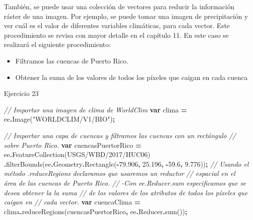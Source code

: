 \documentclass[
  12pt,
  letterpaper,
  twoside]{book}
\newenvironment{Shaded}{\begin{snugshade}}{\end{snugshade}}
\newcommand{\AttributeTok}[1]{\textcolor[rgb]{0.77,0.63,0.00}{#1}}
\newcommand{\CommentTok}[1]{\textcolor[rgb]{0.56,0.35,0.01}{\textit{#1}}}
\newcommand{\FloatTok}[1]{\textcolor[rgb]{0.00,0.00,0.81}{#1}}
\newcommand{\FunctionTok}[1]{\textcolor[rgb]{0.00,0.00,0.00}{#1}}
\newcommand{\KeywordTok}[1]{\textcolor[rgb]{0.13,0.29,0.53}{\textbf{#1}}}
\newcommand{\NormalTok}[1]{#1}
\newcommand{\OperatorTok}[1]{\textcolor[rgb]{0.81,0.36,0.00}{\textbf{#1}}}
\newcommand{\StringTok}[1]{\textcolor[rgb]{0.31,0.60,0.02}{#1}}
\providecommand{\tightlist}{%
  \setlength{\itemsep}{0pt}\setlength{\parskip}{0pt}}
\begin{document}
También, se puede usar una colección de vectores para reducir la información ráster de una imagen. Por ejemplo, se puede tomar una imagen de precipitación y ver cuál es el valor de diferentes variables climáticas, para cada vector. Este procedimiento se revisa con mayor detalle en el capítulo 11. En este caso se realizará el siguiente procedimiento:

\begin{itemize}
\tightlist
\item
  Filtramos las cuencas de Puerto Rico.
\item
  Obtener la suma de los valores de todos los píxeles que caigan en cada cuenca
\end{itemize}

Ejercicio 23

\begin{Shaded}
\begin{Highlighting}[]
\CommentTok{// Importar una imagen de clima de WorldClim}
\KeywordTok{var}\NormalTok{ clima }\OperatorTok{=}\NormalTok{ ee}\OperatorTok{.}\FunctionTok{Image}\NormalTok{(}\StringTok{"WORLDCLIM/V1/BIO"}\NormalTok{)}\OperatorTok{;}

\CommentTok{//  Importar una capa de cuencas y filtramos las cuencas con un rectángulo }
\CommentTok{//  sobre Puerto Rico.}
\KeywordTok{var}\NormalTok{ cuencasPuertorRico }\OperatorTok{=}\NormalTok{ ee}\OperatorTok{.}\FunctionTok{FeatureCollection}\NormalTok{(}\StringTok{\textquotesingle{}USGS/WBD/2017/HUC06\textquotesingle{}}\NormalTok{)}
  \OperatorTok{.}\FunctionTok{filterBounds}\NormalTok{(ee}\OperatorTok{.}\AttributeTok{Geometry}\OperatorTok{.}\FunctionTok{Rectangle}\NormalTok{(}\OperatorTok{{-}}\FloatTok{79.906}\OperatorTok{,} \FloatTok{25.196}\OperatorTok{,} \OperatorTok{{-}}\FloatTok{59.6}\OperatorTok{,} \FloatTok{9.776}\NormalTok{))}\OperatorTok{;}
\CommentTok{//  Usando el método \textasciigrave{}.reduceRegions\textasciigrave{} declaramos que usaremos un reductor }
\CommentTok{//  espacial en el área de las cuencas de Puerto Rico.}
\CommentTok{//    {-}Con \textasciigrave{}ee.Reducer.sum\textasciigrave{} especificamos que se desea obtener la la suma}
\CommentTok{//    de los valores de los atributos de todos los píxeles que caigan en }
\CommentTok{//    cada vector.}
\KeywordTok{var}\NormalTok{ cuencaClima }\OperatorTok{=}\NormalTok{ clima}\OperatorTok{.}\FunctionTok{reduceRegions}\NormalTok{(cuencasPuertorRico}\OperatorTok{,}\NormalTok{ ee}\OperatorTok{.}\AttributeTok{Reducer}\OperatorTok{.}\FunctionTok{sum}\NormalTok{())}\OperatorTok{;}
\end{Highlighting}
\end{Shaded}
\end{document}
